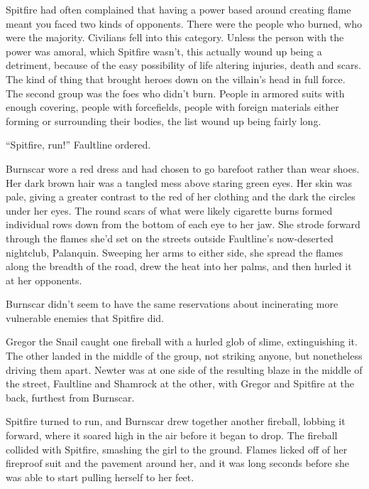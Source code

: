 





Spitfire had often complained that having a power based around creating flame meant you faced two kinds of opponents.  There were the people who burned, who were the majority.  Civilians fell into this category.  Unless the person with the power was amoral, which Spitfire wasn't, this actually wound up being a detriment, because of the easy possibility of life altering injuries, death and scars.  The kind of thing that brought heroes down on the villain's head in full force.  The second group was the foes who didn't burn.  People in armored suits with enough covering, people with forcefields, people with foreign materials either forming or surrounding their bodies, the list wound up being fairly long.



``Spitfire, run!''  Faultline ordered.



Burnscar wore a red dress and had chosen to go barefoot rather than wear shoes.  Her dark brown hair was a tangled mess above staring green eyes.  Her skin was pale, giving a greater contrast to the red of her clothing and the dark the circles under her eyes.  The round scars of what were likely cigarette burns formed individual rows down from the bottom of each eye to her jaw.  She strode forward through the flames she'd set on the streets outside Faultline's now-deserted nightclub, Palanquin.  Sweeping her arms to either side, she spread the flames along the breadth of the road, drew the heat into her palms, and then hurled it at her opponents.



Burnscar didn't seem to have the same reservations about incinerating more vulnerable enemies that Spitfire did.



Gregor the Snail caught one fireball with a hurled glob of slime, extinguishing it.  The other landed in the middle of the group, not striking anyone, but nonetheless driving them apart.  Newter was at one side of the resulting blaze in the middle of the street, Faultline and Shamrock at the other, with Gregor and Spitfire at the back, furthest from Burnscar.



Spitfire turned to run, and Burnscar drew together another fireball, lobbing it forward, where it soared high in the air before it began to drop.  The fireball collided with Spitfire, smashing the girl to the ground.  Flames licked off of her fireproof suit and the pavement around her, and it was long seconds before she was able to start pulling herself to her feet.




